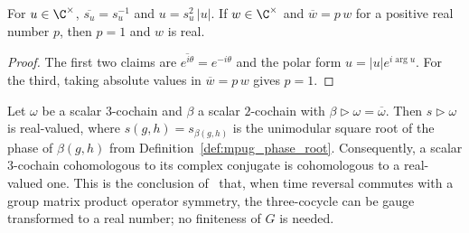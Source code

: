 \begin{lemma}
    \label{thm:mpug_phase_root}
    \leanok
    For $u\in\C^\times$, $\overline{s_u}=s_u^{-1}$ and $u=s_u^2\,|u|$. If
    $w\in\C^\times$ and $\overline w=p\,w$ for a positive real number $p$,
    then $p=1$ and $w$ is real.
\end{lemma}

\begin{proof}\leanok
    The first two claims are $\overline{e^{i\theta}}=e^{-i\theta}$ and the
    polar form $u=|u|e^{i\arg u}$. For the third, taking absolute values in
    $\overline w=p\,w$ gives $p=1$.
\end{proof}

\begin{lemma}
    \label{thm:mpug_time_reversal_real_anomaly}
    \leanok
    Let $\omega$ be a scalar $3$-cochain and $\beta$ a scalar $2$-cochain with
    $\beta\mathbin{\triangleright}\omega=\overline\omega$. Then
    $s\mathbin{\triangleright}\omega$ is real-valued, where
    $s(g,h)=s_{\beta(g,h)}$ is the unimodular square root of the phase of
    $\beta(g,h)$ from Definition~\ref{def:mpug_phase_root}. Consequently, a
    scalar $3$-cochain cohomologous to its complex conjugate is cohomologous
    to a real-valued one. This is the conclusion
    of~\cite[Section~4.3]{GarreRubio2023MPOSym} that, when time reversal
    commutes with a group matrix product operator symmetry, the three-cocycle
    can be gauge transformed to a real number; no finiteness of $G$ is
    needed.
\end{lemma}

